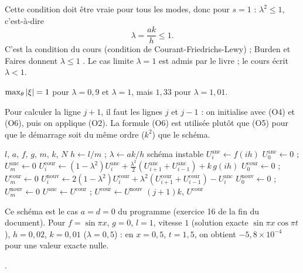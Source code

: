  Cette condition doit être vraie pour tous les modes, donc pour
$s = 1$ : $\lambda^2 \le 1$, c'est-à-dire
\[
  \lambda = \frac{ak}{h} \le 1 .
\]
C'est la condition du cours (condition de Courant-Friedrichs-Lewy) ; Burden et
Faires donnent $\lambda \le 1$ . Le cas limite $\lambda = 1$
est admis par le livre ; le cours écrit $\lambda < 1$.

\Verif $\max_\theta\left|\xi\right| = 1$ pour $\lambda = 0{,}9$ et $\lambda = 1$, mais
$1{,}33$ pour $\lambda = 1{,}01$.

\Pourquoi Pour calculer la ligne $j+1$, il faut les lignes $j$ et $j-1$ : on
initialise avec (O4) et (O6), puis on applique (O2). La formule (O6) est
utilisée plutôt que (O5) pour que le démarrage soit du même ordre ($k^2$) que le
schéma.

\begin{algo}
  \Require $l$, $a$, $f$, $g$, $m$, $k$, $N$
  \State $h \leftarrow l/m$ ; $\lambda \leftarrow ak/h$
   \Print \og schéma instable \fg{} \Stop \EndIf
   \State $U^{\text{anc}}_i \leftarrow f(ih)$ \EndFor
  \State $U^{\text{anc}}_0 \leftarrow 0$ ; $U^{\text{anc}}_m \leftarrow 0$ 
    \State $U^{\text{cour}}_i \leftarrow (1 - \lambda^2)U^{\text{anc}}_i
      + \frac{\lambda^2}{2}(U^{\text{anc}}_{i+1} + U^{\text{anc}}_{i-1}) + k\,g(ih)$ 
  \EndFor
  \State $U^{\text{cour}}_0 \leftarrow 0$ ; $U^{\text{cour}}_m \leftarrow 0$
      \State $U^{\text{nouv}}_i \leftarrow 2(1 - \lambda^2)U^{\text{cour}}_i
        + \lambda^2(U^{\text{cour}}_{i+1} + U^{\text{cour}}_{i-1}) - U^{\text{anc}}_i$ 
    \EndFor
    \State $U^{\text{nouv}}_0 \leftarrow 0$ ; $U^{\text{nouv}}_m \leftarrow 0$
    \State $U^{\text{anc}} \leftarrow U^{\text{cour}}$ ; $U^{\text{cour}} \leftarrow U^{\text{nouv}}$
    \Print $(j+1)k$, $U^{\text{cour}}$
  \EndFor
\end{algo}

\Verif Ce schéma est le cas $a = d = 0$ du programme 
(exercice 16 de la fin du document). Pour $f = \sin\pi x$, $g = 0$, $l = 1$,
vitesse $1$ (solution exacte $\sin\pi x\cos\pi t$), $h = 0{,}02$, $k = 0{,}01$
($\lambda = 0{,}5$) : en $x = 0{,}5$, $t = 1{,}5$, on obtient $-5{,}8\times
10^{-4}$ pour une valeur exacte nulle.

\Refs {}.
